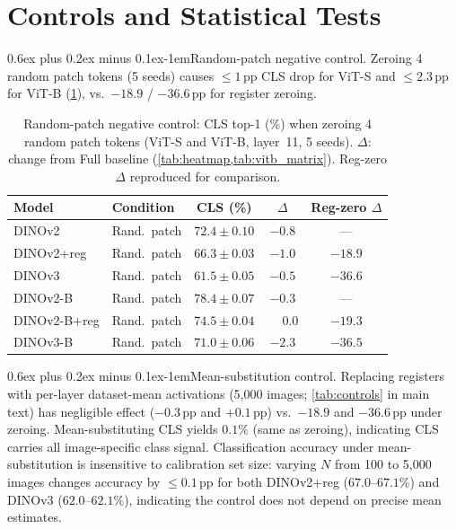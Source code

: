 \documentclass[10pt,twocolumn,letterpaper]{article}
\makeatletter
\renewcommand{\paragraph}{\@startsection{paragraph}{4}{\z@}%
  {0.6ex plus 0.2ex minus 0.1ex}{-1em}{\normalfont\normalsize\bfseries}}
\makeatother
\begin{document}
\section{Controls and Statistical Tests}
\label{sec:supp_controls}

\paragraph{Random-patch negative control.}
\label{sec:supp_random_patch}
Zeroing 4 random patch tokens (5 seeds) causes $\leq\!1$\,pp CLS drop for ViT-S and $\leq\!2.3$\,pp for ViT-B (\cref{tab:random_patch}), vs.\ $-18.9$ / $-36.6$\,pp for register zeroing.

\begin{table}[b]
\centering
\caption{Random-patch negative control: CLS top-1 (\%) when zeroing 4
random patch tokens (ViT-S and ViT-B, layer~11, 5 seeds).
$\Delta$: change from Full baseline (\cref{tab:heatmap,tab:vitb_matrix}).
Reg-zero $\Delta$ reproduced for comparison.}
\label{tab:random_patch}
\scriptsize
\setlength{\tabcolsep}{3pt}
\begin{tabular}{@{}llccc@{}}
\toprule
Model & Condition & CLS (\%) & $\Delta$ & Reg-zero $\Delta$ \\
\midrule
DINOv2       & Rand.\ patch  & $72.4 \pm 0.10$ & $-0.8$ & --- \\
DINOv2+reg   & Rand.\ patch  & $66.3 \pm 0.03$ & $-1.0$ & $-18.9$ \\
DINOv3       & Rand.\ patch  & $61.5 \pm 0.05$ & $-0.5$ & $-36.6$ \\
\midrule
DINOv2-B     & Rand.\ patch  & $78.4 \pm 0.07$ & $-0.3$ & --- \\
DINOv2-B+reg & Rand.\ patch  & $74.5 \pm 0.04$ & $\phantom{-}0.0$ & $-19.3$ \\
DINOv3-B     & Rand.\ patch  & $71.0 \pm 0.06$ & $-2.3$ & $-36.5$ \\
\bottomrule
\end{tabular}
\end{table}

\paragraph{Mean-substitution control.}
\label{sec:supp_meansub}
Replacing registers with per-layer dataset-mean activations (5{,}000 images; \cref{tab:controls} in main text) has negligible effect ($-0.3$\,pp and $+0.1$\,pp) vs.\ $-18.9$ and $-36.6$\,pp under zeroing. Mean-substituting CLS yields $0.1\%$ (same as zeroing), indicating CLS carries all image-specific class signal.
Classification accuracy under mean-substitution is insensitive to calibration set size: varying $N$ from 100 to 5{,}000 images changes accuracy by ${\leq}0.1$\,pp for both DINOv2+reg ($67.0$--$67.1\%$) and DINOv3 ($62.0$--$62.1\%$), indicating the control does not depend on precise mean estimates.
\end{document}
